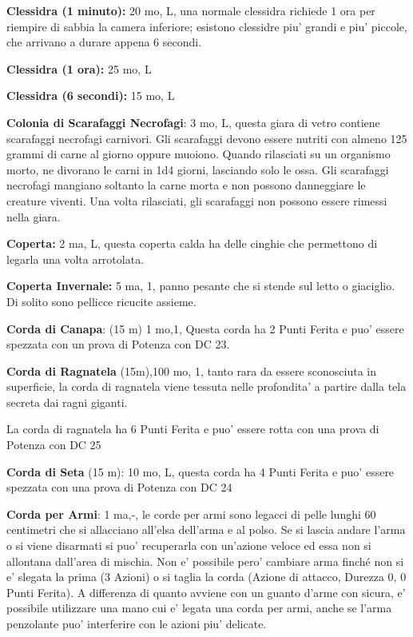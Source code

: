 \documentclass[a4paper,11pt,twoside,openany]{book}
\begin{document}
{		\textbf{Clessidra (1 minuto):} 20 mo, L, una normale clessidra richiede 1 ora per riempire di sabbia la camera inferiore; esistono clessidre piu' grandi e piu' piccole, che arrivano a durare appena 6
		secondi.
		
		\textbf{Clessidra (1 ora):} 25 mo, L
		
		\textbf{Clessidra (6 secondi):} 15 mo, L
		
		\textbf{Colonia di Scarafaggi Necrofagi}: 3 mo, L, questa giara di vetro contiene scarafaggi necrofagi carnivori. Gli scarafaggi devono essere nutriti con almeno 125 grammi di carne al giorno oppure muoiono. Quando rilasciati su un organismo morto, ne divorano le carni in 1d4 giorni, lasciando solo le ossa. Gli scarafaggi necrofagi mangiano soltanto la carne morta e non possono danneggiare le creature viventi. Una volta rilasciati, gli scarafaggi non possono essere rimessi nella giara.
		
		\textbf{Coperta:} 2 ma, L, questa coperta calda ha delle cinghie che permettono di legarla una volta arrotolata.
		
		\textbf{Coperta Invernale:} 5 ma, 1, panno pesante che si stende sul letto o giaciglio. Di solito sono pellicce ricucite assieme.
		
		\textbf{Corda di Canapa}: (15 m) 1 mo,1, Questa corda ha 2 Punti Ferita e puo' essere spezzata con un prova di Potenza con DC 23.
		
		\textbf{Corda di Ragnatela} (15m),100 mo, 1, tanto rara da essere sconosciuta in superficie, la corda di ragnatela viene tessuta nelle profondita’ a partire dalla tela secreta dai ragni giganti.
		
		La corda di ragnatela ha 6 Punti Ferita e puo' essere rotta con una prova di Potenza con DC 25
		
		\textbf{Corda di Seta} (15 m): 10 mo, L, questa corda ha 4 Punti Ferita e puo' essere spezzata con una prova di Potenza con DC 24
		
		\textbf{Corda per Armi}: 1 ma,-, le corde per armi sono legacci di pelle lunghi 60 centimetri che si allacciano all’elsa dell’arma e al polso. Se si lascia andare l’arma o si viene disarmati si puo' recuperarla con un’azione veloce ed essa non si allontana dall’area di mischia. Non e' possibile pero' cambiare arma finché non si e' slegata la prima (3 Azioni) o si taglia la corda (Azione di attacco, Durezza 0, 0 Punti Ferita). A differenza di quanto avviene con un guanto d’arme con sicura, e' possibile utilizzare una mano cui e' legata una corda per armi, anche se l’arma penzolante puo' interferire con le azioni piu' delicate.
		
}
\end{document}
